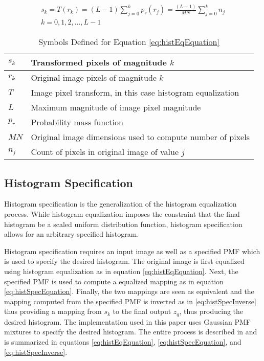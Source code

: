 \documentclass[journal]{IEEEtran}
\begin{document}
\begin{multline} \label{eq:histEqEquation}
s_k = T(r_k) = (L-1)\sum_{j=0}^{k}p_r(r_j)=
\frac{(L-1)}{MN}\sum_{j=0}^{k}n_j\\
k=0,1,2,...,L-1
\end{multline}

\begin{table}
 \centering
 \begin{tabular}{|l|l|}
  \hline
  \(s_k\) & Transformed pixels of magnitude \(k\) \\ \hline
  \(r_k\) & Original image pixels of magnitude \(k\) \\ \hline
  \(T\) & Image pixel transform, in this case histogram equalization \\ \hline
  \(L\) & Maximum magnitude of image pixel magnitude \\ \hline
  \(p_r\) & Probability mass function \\ \hline
  \(MN\) & Original image dimensions used to compute number of pixels \\ \hline
  \(n_j\) & Count of pixels in original image of value \(j\) \\ \hline
 \end{tabular}
 \caption{Symbols Defined for Equation \ref{eq:histEqEquation}}
 \label{tab:histEqTable}
\end{table}

\subsection{Histogram Specification}
Histogram specification is the generalization of the histogram equalization process. While histogram equalization imposes the constraint that the final histogram be a scaled uniform distribution function, histogram specification allows for an arbitrary specified histogram.
\par Histogram specification requires an input image as well as a specified PMF which is used to specify the desired histogram. The original image is first equalized using histogram equalization as in equation \ref{eq:histEqEquation}. Next, the specified PMF is used to compute a equalized mapping as in equation \ref{eq:histSpecEquation}. Finally, the two mappings are seen as equivalent and the mapping computed from the specified PMF is inverted as in \ref{eq:histSpecInverse} thus providing a mapping from \(s_k\) to the final output \(z_q\), thus producing the desired histogram. The implementation used in this paper uses Gaussian PMF mixtures to specify the desired histogram. The entire process is described in \cite[p.~128-138]{Gonzalez} and is summarized in equations \ref{eq:histEqEquation}, \ref{eq:histSpecEquation}, and \ref{eq:histSpecInverse}.
\end{document}
